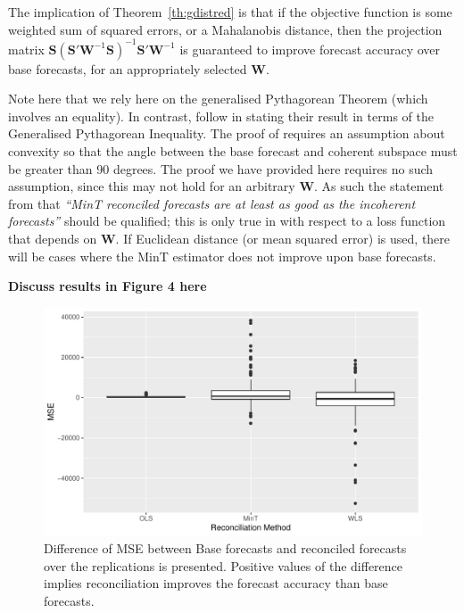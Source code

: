 \documentclass[12pt]{article}
\theoremstyle{definition}
\theoremstyle{property}
\begin{document}
	The implication of Theorem~\ref{th:gdistred} is that if the objective function is some weighted sum of squared errors, or a Mahalanobis distance, then the projection matrix $\bm{S}\left(\bm{S}'\bm{W}^{-1}\bm{S}\right)^{-1}\bm{S}'\bm{W}^{-1}$ is guaranteed to improve forecast accuracy over base forecasts, for an appropriately selected $\bm{W}$.
	
	Note here that we rely here on the generalised Pythagorean Theorem (which involves an equality).  In contrast, \cite{WicEtAl2019} follow \cite{VanErven2015a} in stating their result in terms of the Generalised Pythagorean Inequality.  The proof of \cite{WicEtAl2019} requires an assumption about convexity so that the angle between the base forecast and coherent subspace must be greater than 90 degrees.  The proof we have provided here requires no such assumption, since this may not hold for an arbitrary $\bm{W}$.  As such the statement from \cite{WicEtAl2019} that {\em``MinT reconciled forecasts are at least as good as the incoherent forecasts''} should be qualified; this is only true in with respect to a loss function that depends on ${\bm W}$.  If Euclidean distance (or mean squared error) is used, there will be cases where the MinT estimator does not improve upon base forecasts.
	
	{\bf Discuss results in Figure 4 here}
	
	\begin{figure}[H]
		\centering
		\small
		\includegraphics[width = \textwidth]{Figs/BaseVsRecon_Emp_results.pdf}
		\caption{Difference of MSE between Base forecasts and reconciled forecasts over the replications is presented. Positive values of the difference implies reconciliation improves the forecast accuracy than base forecasts.}\label{fig:BaseVSRecon_Fc}
	\end{figure}
	
\end{document}
